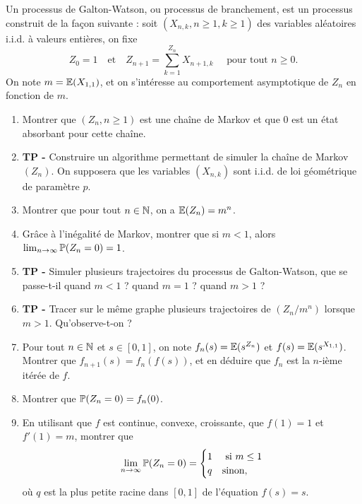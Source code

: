 \documentclass[solutions]{exercices}
\begin{document}
\begin{exercice}
	Un processus de Galton-Watson, ou processus de branchement, est un processus construit de la façon suivante : soit $(X_{n,k}, n \geq 1, k \geq 1)$ des variables aléatoires i.i.d. à valeurs entières, on fixe
	\[
		Z_{0} = 1 \quad \text{et}\quad Z_{n+1} = \sum_{k=1}^{Z_n} X_{n+1,k} \quad \text{ pour tout $n \geq 0$}.
	\]
	On note $m = \E(X_{1,1})$, et on s'intéresse au comportement asymptotique de $Z_n$ en fonction de $m$.
	\begin{enumerate}
		\item Montrer que $(Z_n, n \geq 1)$ est une chaîne de Markov et que $0$ est un état absorbant pour cette chaîne.
		\item \textbf{TP - } Construire un algorithme permettant de simuler la chaîne de Markov $(Z_n)$. On supposera que les variables $(X_{n,k})$ sont i.i.d. de loi géométrique de paramètre $p$.
		\item Montrer que pour tout $n \in \N$, on a $\E(Z_n) = m^n$.
		\item Grâce à l'inégalité de Markov, montrer que si $m < 1$, alors $\lim_{n \to \infty} \P(Z_n = 0) = 1$.
		\item \textbf{TP - } Simuler plusieurs trajectoires du processus de Galton-Watson, que se passe-t-il quand $m<1$ ? quand $m = 1$ ? quand $m > 1$ ?
		\item \textbf{TP - } Tracer sur le même graphe plusieurs trajectoires de $(Z_n/m^n)$ lorsque $m > 1$. Qu'observe-t-on ?
		\item Pour tout $n \in \N$ et $s \in [0,1]$, on note $f_n(s) = \E(s^{Z_n})$ et $f(s)=\E(s^{X_{1,1}})$. Montrer que $f_{n+1}(s) = f_n(f(s))$, et en déduire que $f_n$ est la $n$-ième itérée de $f$.
		\item Montrer que $\P(Z_n = 0) = f_n(0)$.
		\item En utilisant que $f$ est continue, convexe, croissante, que $f(1) = 1$ et $f'(1) = m$, montrer que
		      \[
			      \lim_{n \to \infty} \P(Z_n = 0) = \begin{cases}
				      1 & \text{ si } m \leq 1 \\
				      q & \text{sinon},
			      \end{cases}
		      \]
		      où $q$ est la plus petite racine dans $[0,1]$ de l'équation $f(s) = s$.
	\end{enumerate}
\end{exercice}
\end{document}
